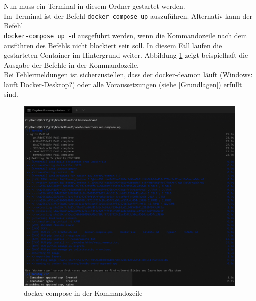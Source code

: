 \documentclass[a4paper,11pt]{scrartcl}
\begin{document}
\noindent Nun muss ein Terminal in diesem Ordner gestartet werden.\\
Im Terminal ist der Befehl \texttt{docker-compose up} auszuführen. Alternativ kann der Befehl \\\texttt{docker-compose up -d} ausgeführt werden, wenn die Kommandozeile nach dem ausführen des Befehls nicht blockiert sein soll. In diesem Fall laufen die gestarteten Container im Hintergrund weiter. Abbildung \ref{img:docker-compose} zeigt beispielhaft die Ausgabe der Befehle in der Kommandozeile.\\ 
Bei Fehlermeldungen ist sicherzustellen, dass der docker-deamon läuft (Windows: läuft Docker-Desktop?) oder alle Voraussetzungen (siehe \ref{Grundlagen}) erfüllt sind.
\begin{figure}[H]
\begin{center}
\includegraphics[width=\linewidth]{docker-compose}
\caption{docker-compose in der Kommandozeile}
\label{img:docker-compose}
\end{center}
\end{figure}
\end{document}
